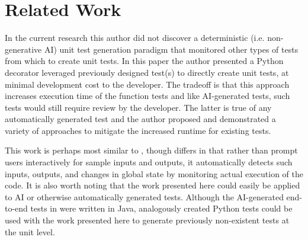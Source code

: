 \section{Related Work}\label{sec:rel-work}
In the current research this author did not discover a deterministic (i.e.
non-generative AI) unit test generation paradigm that monitored other types of
tests from which to create unit tests.  In this paper the author presented
a Python decorator leveraged previously designed test(s) to directly create 
unit tests, at minimal development cost to the developer.
The tradeoff is that this approach increases execution time of the function 
tests and like AI-generated tests, such tests would still require review by the 
developer. The latter is true of any automatically generated test and 
the author proposed and demonstrated a variety of approaches to 
mitigate the increased runtime for existing tests.

This work is perhaps most similar to 
\cite{lahiri2023interactivecodegenerationtestdriven}, though
differs in that rather than prompt users interactively for sample inputs and
outputs, it automatically detects such inputs, outputs, and changes in global
state by monitoring actual execution of the code.  It is also worth noting 
that the work presented here could easily be applied to AI or otherwise 
automatically generated tests.  Although the AI-generated end-to-end tests 
in \cite{leotta2024ai} were written in Java, analogously created Python tests could
be used with the work presented here to generate previously non-existent 
tests at the unit level.